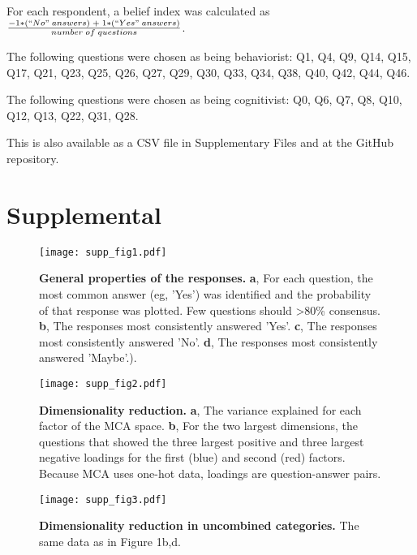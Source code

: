\documentclass[a4paper, 11pt]{article}
\begin{document}
For each respondent, a belief index was calculated as $\frac{-1 * (``No"\;answers)\; +\; 1*(``Yes"\;answers)}{number\;of\;questions}$.

The following questions were chosen as being behaviorist: Q1, Q4, Q9, Q14, Q15, Q17, Q21, Q23, Q25, Q26, Q27, Q29, Q30, Q33, Q34, Q38, Q40, Q42, Q44, Q46.

The following questions were chosen as being cognitivist: Q0, Q6, Q7, Q8, Q10, Q12, Q13, Q22, Q31, Q28.

This is also available as a CSV file in Supplementary Files and at the GitHub repository.

\section*{Supplemental}


\newpage



\setcounter{figure}{0}
\renewcommand{\thefigure}{S\arabic{figure}}

\begin{figure}
\centerline{\texttt{[image: supp\_fig1.pdf]}}
\caption{\textbf{General properties of the responses.} \textbf{a}, For each question, the most common answer (eg, 'Yes') was identified and the probability of that response was plotted. Few questions should >80\% consensus.  \textbf{b}, The responses most consistently answered 'Yes'. \textbf{c}, The responses most consistently answered 'No'. \textbf{d}, The responses most consistently answered 'Maybe'.).}
\end{figure}
\newpage

\begin{figure}
\centerline{\texttt{[image: supp\_fig2.pdf]}}
\caption{\textbf{Dimensionality reduction.} \textbf{a}, The variance explained for each factor of the MCA space. \textbf{b}, For the two largest dimensions, the questions that showed the three largest positive and three largest negative loadings for the first (blue) and second (red) factors. Because MCA uses one-hot data, loadings are question-answer pairs.}
\end{figure}
\newpage

\begin{figure}
\centerline{\texttt{[image: supp\_fig3.pdf]}}
\caption{\textbf{Dimensionality reduction in uncombined categories.} The same data as in Figure 1b,d.}
\end{figure}
\newpage
\end{document}

